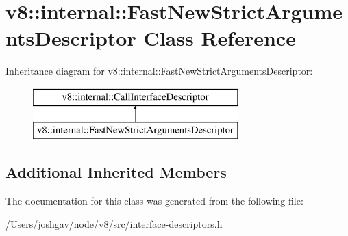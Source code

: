 \hypertarget{classv8_1_1internal_1_1_fast_new_strict_arguments_descriptor}{}\section{v8\+:\+:internal\+:\+:Fast\+New\+Strict\+Arguments\+Descriptor Class Reference}
\label{classv8_1_1internal_1_1_fast_new_strict_arguments_descriptor}
Inheritance diagram for v8\+:\+:internal\+:\+:Fast\+New\+Strict\+Arguments\+Descriptor\+:\begin{figure}[H]
\begin{center}
\leavevmode
\includegraphics[height=2.000000cm]{classv8_1_1internal_1_1_fast_new_strict_arguments_descriptor}
\end{center}
\end{figure}
\subsection*{Additional Inherited Members}


The documentation for this class was generated from the following file\+:\begin{DoxyCompactItemize}
\item 
/\+Users/joshgav/node/v8/src/interface-\/descriptors.\+h\end{DoxyCompactItemize}
